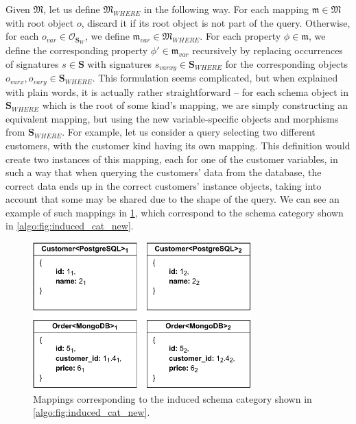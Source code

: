 Given $\mathfrak{M}$, let us define $\mathfrak{M}_{WHERE}$ in the following way.
For each mapping $\mathfrak{m} \in \mathfrak{M}$ with root object $o$, discard it if its root object is not part of the query.
Otherwise, for each $o_{var} \in \mathcal{O}_{\mathbf{S}_W}$, we define $\mathfrak{m}_{var} \in \mathfrak{M}_{WHERE}$.
For each property $\phi \in \mathfrak{m}$, we define the corresponding property $\phi' \in \mathfrak{m}_{var}$ recursively by replacing occurrences of signatures $s \in \mathbf{S}$ with signatures $s_{varxy} \in \mathbf{S}_{WHERE}$ for the corresponding objects $o_{varx}, o_{vary} \in \mathbf{S}_{WHERE}$.
This formulation seems complicated, but when explained with plain words, it is actually rather straightforward -- for each schema object in $\mathbf{S}_{WHERE}$ which is the root of some kind's mapping, we are simply constructing an equivalent mapping, but using the new variable-specific objects and morphisms from $\mathbf{S}_{WHERE}$.
For example, let us consider a query selecting two different customers, with the customer kind having its own mapping.
This definition would create two instances of this mapping, each for one of the customer variables, in such a way that when querying the customers' data from the database, the correct data ends up in the correct customers' instance objects, taking into account that some may be shared due to the shape of the query.
We can see an example of such mappings in \cref{algo:fig:induced_cat_mappings}, which correspond to the schema category shown in \cref{algo:fig:induced_cat_new}.

\begin{figure}[ht]
\centering
\includegraphics[width=0.75\textwidth]{img/induced-category-mappings.pdf} 
\caption{Mappings corresponding to the induced schema category shown in \cref{algo:fig:induced_cat_new}.}
\label{algo:fig:induced_cat_mappings}
\end{figure}

